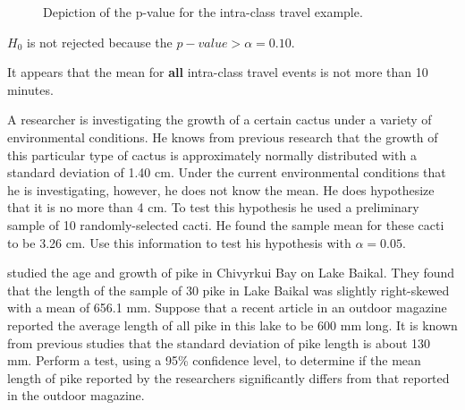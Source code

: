 \documentclass[10pt,openany]{book}\usepackage[]{graphicx}\usepackage[]{color}
\newenvironment{knitrout}{}{} %
\begin{document}
\begin{Enumerate}
\begin{knitrout}
\begin{figure}[!h]
{}

\caption[Depiction of the p-value for the intra-class travel example]{Depiction of the p-value for the intra-class travel example.}\label{fig:Ex1Zpvalue}
\end{figure}


\end{knitrout}
  \item $H_{0}$ is not rejected because the $p-value >\alpha=0.10$.
  \item It appears that the mean for \textbf{all} intra-class travel events is not more than 10 minutes.
\end{Enumerate}

\begin{exsection}
  \item \label{revex:HypTestZCactus} A researcher is investigating the growth of a certain cactus under a variety of environmental conditions.  He knows from previous research that the growth of this particular type of cactus is approximately normally distributed with a standard deviation of 1.40 cm.  Under the current environmental conditions that he is investigating, however, he does not know the mean.  He does hypothesize that it is no more than 4 cm.  To test this hypothesis he used a preliminary sample of 10 randomly-selected cacti.  He found the sample mean for these cacti to be 3.26 cm.  Use this information to test his hypothesis with $\alpha=0.05$. 
  \item \label{revex:HypTestZPike} \cite{OwensPronin2000} studied the age and growth of pike in Chivyrkui Bay on Lake Baikal.  They found that the length of the sample of 30 pike in Lake Baikal was slightly right-skewed with a mean of 656.1 mm.  Suppose that a recent article in an outdoor magazine reported the average length of all pike in this lake to be 600 mm long.  It is known from previous studies that the standard deviation of pike length is about 130 mm.  Perform a test, using a 95\% confidence level, to determine if the mean length of pike reported by the researchers significantly differs from that reported in the outdoor magazine.  
\end{exsection}
\end{document}
